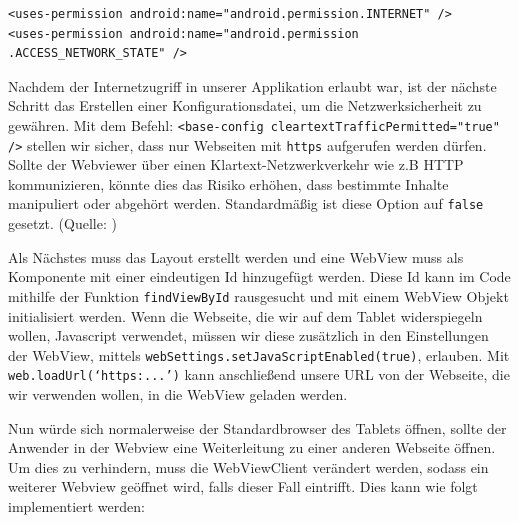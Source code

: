 \begin{lstlisting}[caption={Internetzugriff erlauben}]
<uses-permission android:name="android.permission.INTERNET" />
<uses-permission android:name="android.permission
.ACCESS_NETWORK_STATE" />
\end{lstlisting}

Nachdem der Internetzugriff in unserer Applikation erlaubt war, ist der nächste Schritt das Erstellen einer Konfigurationsdatei, um die Netzwerksicherheit zu gewähren. Mit dem Befehl: \verb|<base-config cleartextTrafficPermitted="true" />| stellen wir sicher, dass nur Webseiten mit \verb|https| aufgerufen werden dürfen.  %
Sollte der Webviewer über einen Klartext-Netzwerkverkehr wie z.B HTTP kommunizieren, könnte dies das Risiko erhöhen, dass bestimmte Inhalte manipuliert oder abgehört werden. Standardmäßig ist diese Option auf \verb|false| gesetzt. 
(Quelle: \cite{webview})

Als Nächstes muss das Layout erstellt werden und eine WebView muss als Komponente mit einer eindeutigen Id hinzugefügt werden. Diese Id kann im Code mithilfe der Funktion \verb|findViewById| rausgesucht und mit einem WebView Objekt initialisiert werden. Wenn die Webseite, die wir 
auf dem Tablet widerspiegeln wollen, Javascript verwendet, müssen wir diese zusätzlich in den Einstellungen der WebView, mittels \verb|webSettings.setJavaScriptEnabled(true)|, erlauben. Mit \verb|web.loadUrl(‘https:...’)| kann anschließend unsere URL von der Webseite, die wir verwenden wollen, in die WebView geladen werden. 

Nun würde sich normalerweise der Standardbrowser des Tablets öffnen, sollte der Anwender in der Webview eine Weiterleitung zu einer anderen Webseite öffnen. Um dies zu verhindern, muss die WebViewClient verändert werden, sodass ein weiterer Webview geöffnet wird, falls dieser Fall eintrifft. Dies kann wie folgt implementiert werden: \\

